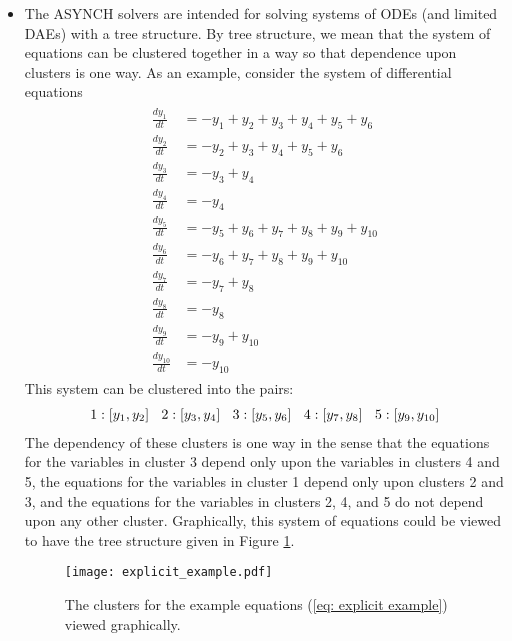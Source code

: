 \documentclass[12pt]{article}
\begin{document}
\begin{itemize}
 \item The ASYNCH solvers are intended for solving systems of ODEs (and limited DAEs) with a tree structure. By tree structure, we mean that the system of equations can be clustered together in a way so that dependence upon clusters is one way. As an example, consider the system of differential equations
 \begin{align}
  \begin{split} \label{eq: explicit example}
  \frac{dy_1}{dt} &= -y_1 + y_2 + y_3 + y_4 + y_5 + y_6 \\
  \frac{dy_2}{dt} &= -y_2 + y_3 + y_4 + y_5 + y_6 \\
  \frac{dy_3}{dt} &= -y_3 + y_4 \\
  \frac{dy_4}{dt} &= -y_4 \\
  \frac{dy_5}{dt} &= -y_5 + y_6 + y_7 + y_8 + y_9 + y_{10} \\
  \frac{dy_6}{dt} &= -y_6 + y_7 + y_8 + y_9 + y_{10} \\
  \frac{dy_7}{dt} &= -y_7 + y_8 \\
  \frac{dy_8}{dt} &= -y_8 \\
  \frac{dy_9}{dt} &= -y_9 + y_{10} \\
  \frac{dy_{10}}{dt} &= -y_{10}
  \end{split}
 \end{align}
 This system can be clustered into the pairs:
 \begin{align*}
  1: \left[y_1, y_2\right] \hspace{.1in} 2:\left[y_3, y_4\right] \hspace{.1in} 3:\left[y_5, y_6\right] \hspace{.1in} 4:\left[y_7, y_8\right] \hspace{.1in} 5:\left[y_9, y_{10}\right]
 \end{align*}
 The dependency of these clusters is one way in the sense that the equations for the variables in cluster 3 depend only upon the variables in clusters 4 and 5, the equations for the variables in cluster 1 depend only upon clusters 2 and 3, and the equations for the variables in clusters 2, 4, and 5 do not depend upon any other cluster. Graphically, this system of equations could be viewed to have the tree structure given in Figure \ref{fig: ExplicitExample}.
 
\begin{figure}[ht]
\centering
\texttt{[image: explicit\_example.pdf]}
\caption{The clusters for the example equations (\ref{eq: explicit example}) viewed graphically.}
\label{fig: ExplicitExample}
\end{figure}


\end{itemize}
\end{document}
